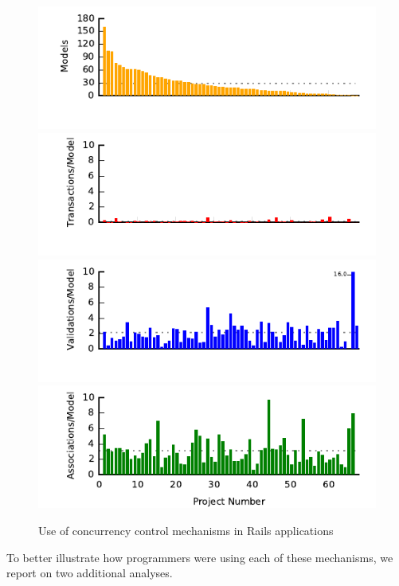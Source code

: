 \begin{figure}
  \newcommand{\skipht}{\\[-2em]}
\includegraphics[width=\columnwidth]{figs/models-single-bar.pdf}\skipht
\includegraphics[width=\columnwidth]{figs/transactions-single-bar.pdf}\skipht
\includegraphics[width=\columnwidth]{figs/validations-single-bar.pdf}\skipht
\includegraphics[width=\columnwidth]{figs/associations-single-bar.pdf}\skipht
\caption{Use of concurrency control mechanisms in Rails applications}
\label{fig:usages}
\end{figure}

 To better illustrate how programmers
were using each of these mechanisms, we report on two additional
analyses.

